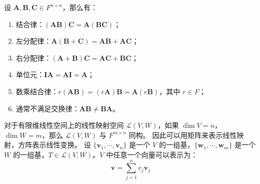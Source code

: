 \begin{proposition}[方阵乘法的性质]
    设 $\mathbf{A},\mathbf{B},\mathbf{C}\in F^{n \times n}$，那么有：
    \begin{enumerate}
        \item 结合律：$(\mathbf{A}\mathbf{B})\mathbf{C} = \mathbf{A}(\mathbf{B}\mathbf{C})$；
        \item 左分配律：$\mathbf{A}(\mathbf{B} + \mathbf{C}) = \mathbf{A}\mathbf{B} + \mathbf{A}\mathbf{C}$；
        \item 右分配律：$(\mathbf{A} + \mathbf{B})\mathbf{C} = \mathbf{A}\mathbf{C} + \mathbf{B}\mathbf{C}$；
        \item 单位元：$\mathbf{I}\mathbf{A} = \mathbf{A}\mathbf{I} = \mathbf{A}$；
        \item 数乘结合律：$r(\mathbf{A}\mathbf{B}) = (r\mathbf{A})\mathbf{B} = \mathbf{A}(r\mathbf{B})$，其中 $r\in F$；
        \item 通常不满足交换律：$\mathbf{A}\mathbf{B} \neq \mathbf{B}\mathbf{A}$。
    \end{enumerate}
\end{proposition}
\vspace{1em}

对于有限维线性空间上的线性映射空间 $\mathcal{L}(V,W)$，如果 $\dim V = n$，$\dim W = m$，那么 $\mathcal{L}(V,W)$ 与 $F^{m \times n}$ 同构。
因此可以用矩阵来表示线性映射，方阵表示线性变换。
设 $\{\mathbf{v}_1,\cdots,\mathbf{v}_n\}$ 是一个 $V$ 的一组基，$\{\mathbf{w}_1,\cdots,\mathbf{w}_m\}$ 是一个 $W$ 的一组基，$T\in \mathcal{L}(V,W)$。$V$ 中任意一个向量可以表示为：
\[
    \mathbf{v} = \sum_{j=1}^{n} v_j \mathbf{v}_j
\]

